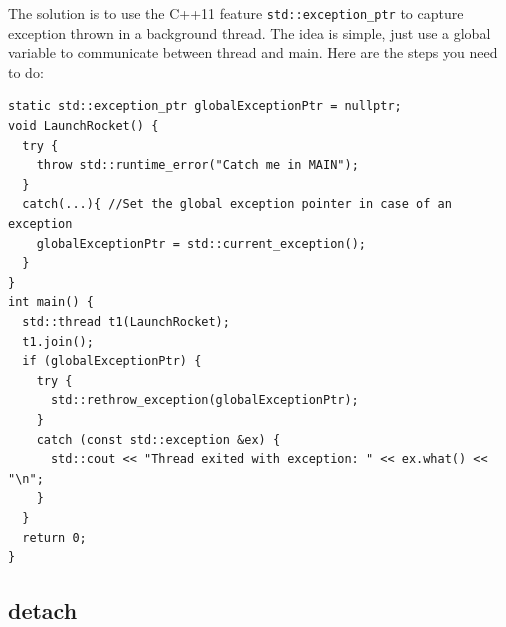 \documentclass[a4paper,11pt,twoside]{book}
\begin{document}
\begin{itemize}
The solution is to use the C++11 feature \texttt{std::exception\_ptr} to capture exception thrown in a background thread. The idea is simple, just use a global variable to communicate between thread and main.  Here are the steps you need to do:
\begin{lstlisting}[]
static std::exception_ptr globalExceptionPtr = nullptr;
void LaunchRocket() {
  try {
    throw std::runtime_error("Catch me in MAIN");
  }
  catch(...){ //Set the global exception pointer in case of an exception
    globalExceptionPtr = std::current_exception();
  }
}
int main() {
  std::thread t1(LaunchRocket);
  t1.join();
  if (globalExceptionPtr) {
    try {
      std::rethrow_exception(globalExceptionPtr);
    }
    catch (const std::exception &ex) {
      std::cout << "Thread exited with exception: " << ex.what() << "\n";
    }
  }
  return 0;
}
\end{lstlisting}

\end{itemize}

\subsection{detach}
\end{document}
